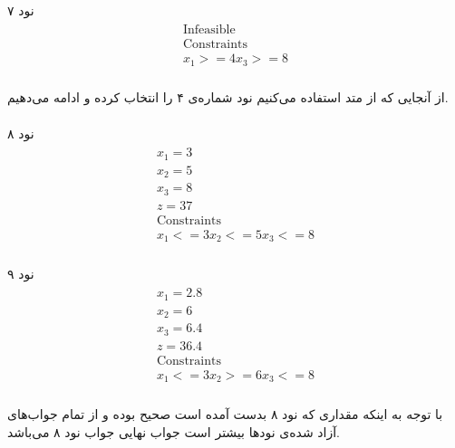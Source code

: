 \documentclass[paper=a4, fontsize=11pt]{article}
\numberwithin{equation}{section} %
\numberwithin{figure}{section} %
\numberwithin{table}{section} %
\begin{document}
\paragraph{}
نود ۷
\begin{align}
\begin{split}
	\text{Infeasible}\\
	\text{Constraints}\\
	x_1 >= 4
	x_3 >= 8
\end{split}
\end{align}

\paragraph{}
از آنجایی که از متد  استفاده می‌کنیم
نود شماره‌ی ۴ را انتخاب کرده و ادامه می‌دهیم.

\paragraph{}
نود ۸
\begin{align}
\begin{split}
	x_1 = 3\\
	x_2 = 5\\
	x_3 = 8\\
	z = 37\\
	\text{Constraints}\\
	x_1 <= 3
	x_2 <= 5
	x_3 <= 8
\end{split}
\end{align}

\paragraph{}
نود ۹
\begin{align}
\begin{split}
	x_1 = 2.8\\
	x_2 = 6\\
	x_3 = 6.4\\
	z = 36.4\\
	\text{Constraints}\\
	x_1 <= 3
	x_2 >= 6
	x_3 <= 8
\end{split}
\end{align}

\paragraph{}
با توجه به اینکه مقداری که نود ۸ بدست آمده است صحیح بوده
و از تمام جواب‌های آزاد شده‌ی نودها بیشتر است جواب نهایی جواب نود ۸ می‌باشد.
\end{document}
